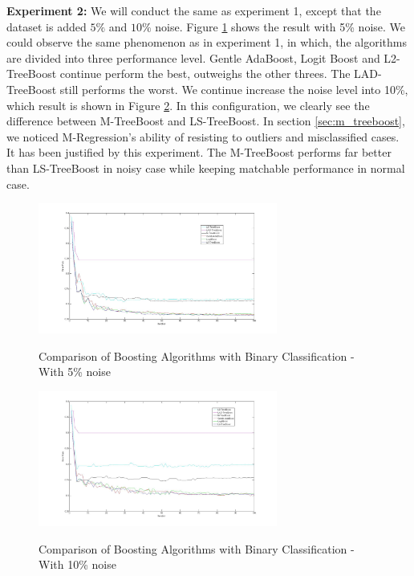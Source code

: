 \documentclass[a4paper,twoside,12pt]{article}
\begin{document}
\textbf{Experiment 2:} We will conduct the same as experiment 1, except that the dataset is added $5\%$ and $10\%$ noise. Figure \ref{fig:bin_class_comparison_noise_5per} shows the result with 5\% noise. We could observe the same phenomenon as in experiment 1, in which, the algorithms are divided into three performance level. Gentle AdaBoost, Logit Boost and L2-TreeBoost continue perform the best, outweighs the other threes. The LAD-TreeBoost still performs the worst.
We continue increase the noise level into 10\%, which result is shown in Figure \ref{fig:bin_class_comparison_noise_10per}. In this configuration, we clearly see the difference between M-TreeBoost and LS-TreeBoost. In section \ref{sec:m_treeboost}, we noticed M-Regression's ability of resisting to outliers and misclassified cases. It has been justified by this experiment. The M-TreeBoost performs far better than LS-TreeBoost in noisy case while keeping matchable performance in normal case.
\begin{figure}[H]
\centering
\caption{Comparison of Boosting Algorithms with Binary Classification - With 5\% noise}
\includegraphics[width = 0.7\textwidth]{Figures/bin_class_comparison_noise_5per}
\label{fig:bin_class_comparison_noise_5per}
\end{figure}
\begin{figure}[H]
\centering
\caption{Comparison of Boosting Algorithms with Binary Classification - With 10\% noise}
\includegraphics[width = 0.7\textwidth]{Figures/bin_class_comparison_noise_10per}
\label{fig:bin_class_comparison_noise_10per}
\end{figure}
\end{document}
